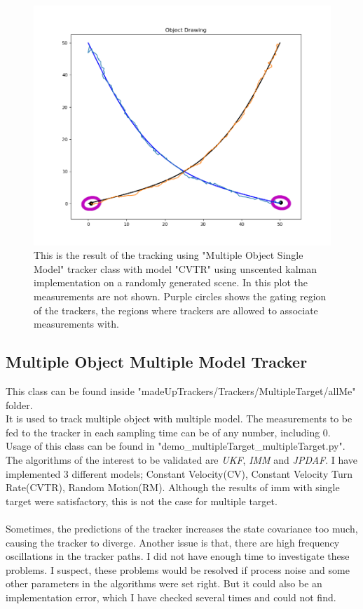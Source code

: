 \documentclass[peerreview]{IEEEtran}
\begin{document}
\begin{figure}[htbp]
\centerline{\includegraphics[scale=.3]{multiTarget_singleModel_cross.png}}
\caption{This is the result of the tracking using "Multiple Object Single Model" tracker class with model "CVTR" using unscented kalman implementation on a randomly generated scene. In this plot the measurements are not shown. Purple circles shows the gating region of the trackers, the regions where trackers are allowed to associate measurements with.}
\label{fig}
\end{figure}

\subsection{Multiple Object Multiple Model Tracker}

This class can be found inside "madeUpTrackers/Trackers/MultipleTarget/allMe" folder. \\

It is used to track multiple object with multiple model. The measurements to be fed to the tracker in each sampling time can be of any number, including 0. Usage of this class can be found in "demo\_multipleTarget\_multipleTarget.py". \\

The algorithms of the interest to be validated are \emph{UKF}, \emph{IMM} and \emph{JPDAF}. I have implemented 3 different models; Constant Velocity(CV), Constant Velocity Turn Rate(CVTR), Random Motion(RM). Although the results of imm with single target were satisfactory, this is not the case for multiple target. \\ \\ Sometimes, the predictions of the tracker increases the state covariance too much, causing the tracker to diverge. Another issue is that, there are high frequency oscillations in the tracker paths. I did not have enough time to investigate these problems. I suspect, these problems would be resolved if process noise and some other parameters in the algorithms were set right. But it could also be an implementation error, which I have checked several times and could not find.
\end{document}
